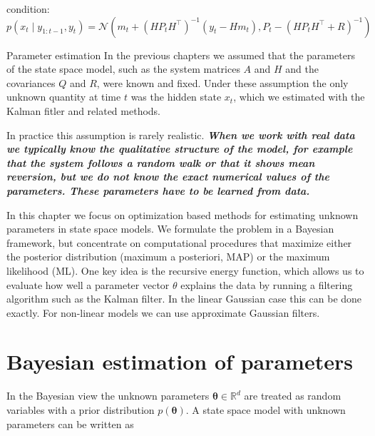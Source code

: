 condition: $p(x_t \mid y_{1:t-1}, y_t)= \mathcal{N}(m_t+(HP_tH^\top)^{-1}(y_t-Hm_t), P_t-(HP_tH^\top+R)^{-1})$


Parameter estimation
In the previous chapters we assumed that the parameters of the state space model, such as the system matrices $A$ and $H$ and the covariances $Q$ and $R$, were known and fixed. Under these assumption the only unknown quantity at time $t$ was the hidden state $x_t$, which we estimated with the Kalman fitler and related methods. 

In practice this assumption is rarely realistic. \textbf{\textit{When we work with real data we typically know the qualitative structure of the model, for example that the system follows a random walk  or that it shows mean reversion, but we do not know the exact numerical values of the parameters. These parameters have to be learned from data. }}

In this chapter we focus on optimization based methods for estimating unknown parameters in state space models. We formulate the problem in a Bayesian framework, but concentrate on computational procedures that maximize either the posterior distribution (maximum a posteriori, MAP) or the maximum likelihood (ML). One key idea is the recursive energy function, which allows us to evaluate how well a parameter vector $\theta$ explains the data by running a filtering algorithm such as the Kalman filter. In the linear Gaussian case this can be done exactly. For non-linear models we can use approximate Gaussian filters. 



\section{Bayesian estimation of parameters}
In the Bayesian view the unknown parameters $\boldsymbol{\theta} \in \mathbb{R}^d$ are treated as random variables with a prior distribution $p(\boldsymbol{\theta})$. A state space model with unknown parameters can be written as 

